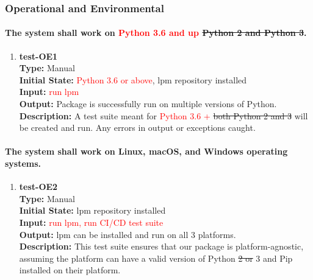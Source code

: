 \documentclass[12pt, titlepage]{article}
\begin{document}
\subsubsection{Operational and Environmental}
\paragraph{The system shall work on \textcolor{red}{Python 3.6 and up} \sout{Python 2 and Python 3}.}
\begin{enumerate}
    \item{\textbf{test-OE1}\\}
    \textbf{Type:} Manual\\
    \textbf{Initial State:} \textcolor{red}{Python 3.6 or above}, lpm repository installed\\
    \textbf{Input:} \textcolor{red}{run lpm}\\
    \textbf{Output:} Package is successfully run on multiple versions of Python. \\
    \textbf{Description:} A test suite meant for \textcolor{red}{Python 3.6 +} \sout{both Python 2 and 3} will be created and run. Any errors in output or exceptions caught.\\
\end{enumerate}

\paragraph{The system shall work on Linux, macOS, and Windows operating systems.}
\begin{enumerate}
    \item{\textbf{test-OE2}\\}
    \textbf{Type:} Manual\\
    \textbf{Initial State:} lpm repository installed\\
    \textbf{Input:} \textcolor{red}{run lpm, run CI/CD test suite}\\
    \textbf{Output:} lpm can be installed and run on all 3 platforms. \\
    \textbf{Description:} This test suite ensures that our package is platform-agnostic, assuming the platform can have a valid version of Python \sout{2 or} 3 and Pip installed on their platform.\\
\end{enumerate}
\end{document}
